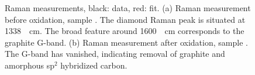 		\begin{figure}
			\begin{subfigure}[tp]{0.45\linewidth}
				\caption{}\label{subfig::raman_no}
				\centering
			\end{subfigure}
			\hfill
			\begin{subfigure}[tp]{0.45\linewidth}
				\caption{}\label{subfig::raman_ox}
				\centering
			\end{subfigure}
			\caption{Raman measurements, black: data, red: fit. (a) Raman measurement before oxidation, sample \insituS. The diamond Raman peak is situated at \SI{1338}{\per\centi\meter}. The broad feature around \SI{1600}{\per\centi\meter} corresponds to the graphite G-band. (b) Raman measurement after oxidation, sample \insituSo. The G-band has vanished, indicating removal of graphite and amorphous sp$^2$ hybridized carbon.}
			\label{fig::raman}
		\end{figure}

